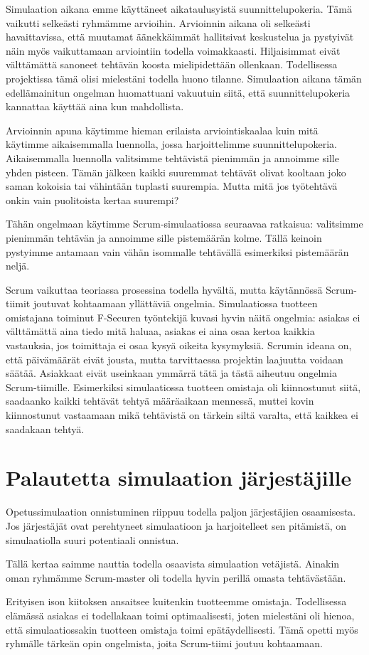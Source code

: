 \documentclass[a4paper]{article}
\begin{document}
Simulaation aikana emme käyttäneet aikataulusyistä suunnittelupokeria. Tämä vaikutti selkeästi ryhmämme arvioihin. Arvioinnin aikana oli selkeästi havaittavissa, että muutamat äänekkäimmät hallitsivat keskustelua ja pystyivät näin myös vaikuttamaan arviointiin todella voimakkaasti. Hiljaisimmat eivät välttämättä sanoneet tehtävän koosta mielipidettään ollenkaan. Todellisessa projektissa tämä olisi mielestäni todella huono tilanne. Simulaation aikana tämän edellämainitun ongelman huomattuani vakuutuin siitä, että suunnittelupokeria kannattaa käyttää aina kun mahdollista.

Arvioinnin apuna käytimme hieman erilaista arviointiskaalaa kuin mitä käytimme aikaisemmalla luennolla, jossa harjoittelimme suunnittelupokeria. Aikaisemmalla luennolla valitsimme tehtävistä pienimmän ja annoimme sille yhden pisteen. Tämän jälkeen kaikki suuremmat tehtävät olivat kooltaan joko saman kokoisia tai vähintään tuplasti suurempia. Mutta mitä jos työtehtävä onkin vain puolitoista kertaa suurempi?

Tähän ongelmaan käytimme Scrum-simulaatiossa seuraavaa ratkaisua: valitsimme pienimmän tehtävän ja annoimme sille pistemäärän kolme. Tällä keinoin pystyimme antamaan vain vähän isommalle tehtävällä esimerkiksi pistemäärän neljä.



Scrum vaikuttaa teoriassa prosessina todella hyvältä, mutta käytännössä Scrum-tiimit joutuvat kohtaamaan yllättäviä ongelmia. Simulaatiossa tuotteen omistajana toiminut F-Securen työntekijä kuvasi hyvin näitä ongelmia: asiakas ei välttämättä aina tiedo mitä haluaa, asiakas ei aina osaa kertoa kaikkia vastauksia, jos toimittaja ei osaa kysyä oikeita kysymyksiä. Scrumin ideana on, että päivämäärät eivät jousta, mutta tarvittaessa projektin laajuutta voidaan säätää. Asiakkaat eivät useinkaan ymmärrä tätä ja tästä aiheutuu ongelmia Scrum-tiimille. Esimerkiksi simulaatiossa tuotteen omistaja oli kiinnostunut siitä, saadaanko kaikki tehtävät tehtyä määräaikaan mennessä, muttei kovin kiinnostunut vastaamaan mikä tehtävistä on tärkein siltä varalta, että kaikkea ei saadakaan tehtyä.

\section{Palautetta simulaation järjestäjille}

Opetussimulaation onnistuminen riippuu todella paljon järjestäjien osaamisesta. Jos järjestäjät ovat perehtyneet simulaatioon ja harjoitelleet sen pitämistä, on simulaatiolla suuri potentiaali onnistua.

Tällä kertaa saimme nauttia todella osaavista simulaation vetäjistä. Ainakin oman ryhmämme Scrum-master oli todella hyvin perillä omasta tehtävästään.

Erityisen ison kiitoksen ansaitsee kuitenkin tuotteemme omistaja. Todellisessa elämässä asiakas ei todellakaan toimi optimaalisesti, joten mielestäni oli hienoa, että simulaatiossakin tuotteen omistaja toimi epätäydellisesti. Tämä opetti myös ryhmälle tärkeän opin ongelmista, joita Scrum-tiimi joutuu kohtaamaan.
\end{document}
